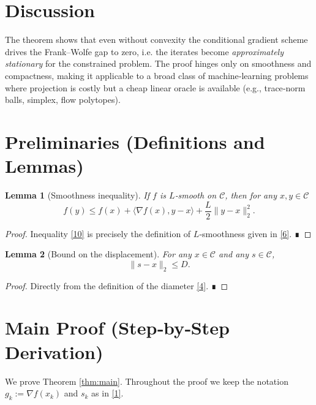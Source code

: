 \documentclass{article}
\newtheorem{lemma}{Lemma}
\begin{document}
\section*{Discussion}
The theorem shows that even without convexity the conditional gradient scheme drives the Frank–Wolfe gap to zero, i.e. the iterates become \emph{approximately stationary} for the constrained problem. The proof hinges only on smoothness and compactness, making it applicable to a broad class of machine‑learning problems where projection is costly but a cheap linear oracle is available (e.g., trace‑norm balls, simplex, flow polytopes).

\newpage
\section*{Preliminaries (Definitions and Lemmas)}
\begin{lemma}[Smoothness inequality]\label{lem:smooth}
If $f$ is $L$‑smooth on $\mathcal{C}$, then for any $x,y\in\mathcal{C}$
\[
f(y)\le f(x)+\langle \nabla f(x),y-x\rangle+\frac{L}{2}\|y-x\|_2^2 .
\tag{10}
\]
\end{lemma}
\begin{proof}
Inequality \eqref{10} is precisely the definition of $L$‑smoothness given in \eqref{6}. ∎
\end{proof}

\begin{lemma}[Bound on the displacement]\label{lem:diam}
For any $x\in\mathcal{C}$ and any $s\in\mathcal{C}$,
\[
\|s-x\|_2\le D .
\tag{11}
\]
\end{lemma}
\begin{proof}
Directly from the definition of the diameter \eqref{4}. ∎
\end{proof}

\section*{Main Proof (Step‑by‑Step Derivation)}
We prove Theorem \ref{thm:main}. Throughout the proof we keep the notation $g_k:=\nabla f(x_k)$ and $s_k$ as in \eqref{1}.
\end{document}
